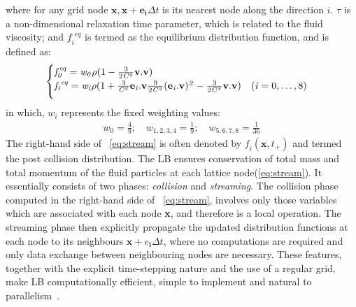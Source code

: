 where for any grid node $\mathbf{x},\mathbf{x}+\mathbf{e_i} \Delta t$ is its nearest node along the direction $\mathit{i}$. $\tau$ is a non-dimensional relaxation time parameter, which is related to the fluid viscosity; and $\mathit{f_i}^{\mathit{eq}}$ is termed as the equilibrium distribution function, and is defined as:
\begin{eqnarray}
\begin{cases}
\mathit{f}_{\mathit{0}}^{\mathit{eq}}=\mathit{w}_{\mathit{0}} \rho (1 - \frac{3}{2\mathit{C}^{\mathit{2}}}\mathbf{v}.\mathbf{v}) \\ 
\vspace*{2mm}
\mathit{f_i}^{\mathit{eq}}=\mathit{w_i} \rho (1 + \frac{3}{\mathit{C}^{\mathit{2}}}\mathbf{e}_{\mathit{i}}.\mathbf{v} \frac{9}{2\mathit{C}^{\mathit{2}}} (\mathbf{e}_{\mathit{i}}.\mathbf{v})^{\mathit{2}}-\frac{3}{2 \mathit{C}^{\mathit{2}}}\mathbf{v}.\mathbf{v}) \quad (\mathit{i}=0,\dots,8)
\end{cases}
\end{eqnarray}
in which, $\mathit{w_i}$ represents the fixed weighting values:
\begin{eqnarray}
\mathit{w}_{\mathit{0}} = \frac{4}{9}; \quad \mathit{w}_{\mathit{1,2,3,4}}= \frac{1}{9}; \quad \mathit{w}_{\mathit{5,6,7,8}}= \frac{1}{36}
\end{eqnarray}
The right-hand side of ~\cref{eq:stream} is often denoted by $\mathit{f_i}(\mathbf{x}, \mathit{t}_{+})$ and termed the post collision distribution. The LB ensures conservation of total mass and total momentum of the fluid particles at each lattice node(\cref{eq:stream}). It essentially consists of two phases: \textit{collision} and \textit{streaming}. The collision phase computed in the right-hand side of ~\cref{eq:stream}, involves only those variables which are associated with each node \textbf{x}, and therefore is a local operation. The streaming phase then explicitly propagate the updated distribution functions at each node to its neighbours $\mathbf{x}+\mathbf{\mathit{e}_i} \Delta t$, where no computations are required and only data exchange between neighbouring nodes are necessary. These features, together with the explicit time-stepping nature and the use of a regular grid, make LB computationally efficient, simple to implement and natural to parallelism~\citep{Han2007}. 

